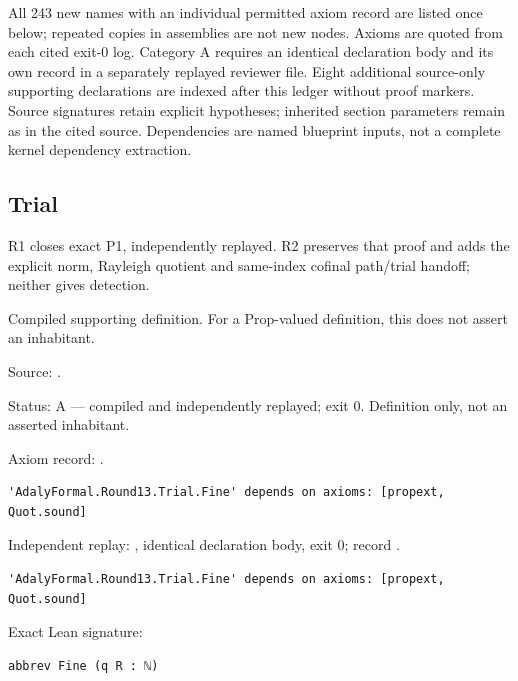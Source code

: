 All 243 new names with an individual permitted axiom record are listed once below; repeated copies in assemblies are not new nodes. Axioms are quoted from each cited exit-0 log. Category A requires an identical declaration body and its own record in a separately replayed reviewer file. Eight additional source-only supporting declarations are indexed after this ledger without proof markers. Source signatures retain explicit hypotheses; inherited section parameters remain as in the cited source. Dependencies are named blueprint inputs, not a complete kernel dependency extraction.

\subsection{Trial}

R1 closes exact P1, independently replayed. R2 preserves that proof and adds the explicit norm, Rayleigh quotient and same-index cofinal path/trial handoff; neither gives detection.

\begin{definition}[bp-341]
\label{bp-341}
\uses{}
\leanok
Compiled supporting definition. For a Prop-valued definition, this does not assert an inhabitant.

\par Source: \texttt{}.
\par Status: A — compiled and independently replayed; exit 0. Definition only, not an asserted inhabitant.
\par Axiom record: \texttt{}.
\begin{verbatim}
'AdalyFormal.Round13.Trial.Fine' depends on axioms: [propext, Quot.sound]
\end{verbatim}
\par Independent replay: \texttt{}, identical declaration body, exit 0; record \texttt{}.
\begin{verbatim}
'AdalyFormal.Round13.Trial.Fine' depends on axioms: [propext, Quot.sound]
\end{verbatim}
\par Exact Lean signature:
\begin{verbatim}
abbrev Fine (q R : ℕ)
\end{verbatim}
\end{definition}

